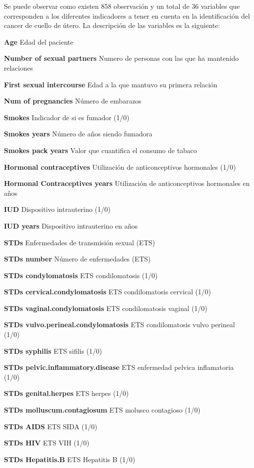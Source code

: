 \documentclass[
]{article}
\begin{document}
Se puede observar como existen 858 observación y un total de 36
variables que corresponden a los diferentes indicadores a tener en
cuenta en la identificación del cancer de cuello de útero. La
descripción de las variables es la siguiente:

\textbf{Age} Edad del paciente

\textbf{Number of sexual partners} Numero de personas con las que ha
mantenido relaciones

\textbf{First sexual intercourse} Edad a la que mantuvo su primera
relación

\textbf{Num of pregnancies} Número de embarazos

\textbf{Smokes} Indicador de si es fumador (1/0)

\textbf{Smokes years} Número de años siendo fumadora

\textbf{Smokes pack years} Valor que cuantifica el consumo de tabaco

\textbf{Hormonal contraceptives} Utilización de anticonceptivos
hormonales (1/0)

\textbf{Hormonal Contraceptives years} Utilización de anticonceptivos
hormonales en años

\textbf{IUD} Dispositivo intrauterino (1/0)

\textbf{IUD years} Dispositivo intrauterino en años

\textbf{STDs} Enfermedades de transmisión sexual (ETS)

\textbf{STDs number} Número de enfermedades (ETS)

\textbf{STDs condylomatosis} ETS condilomatosis (1/0)

\textbf{STDs cervical.condylomatosis} ETS condilomatosis cervical (1/0)

\textbf{STDs vaginal.condylomatosis} ETS condilomatosis vaginal (1/0)

\textbf{STDs vulvo.perineal.condylomatosis} ETS condilomatosis vulvo
perineal (1/0)

\textbf{STDs syphilis} ETS sifilis (1/0)

\textbf{STDs pelvic.inflammatory.disease} ETS enfermedad pelvica
inflamatoria (1/0)

\textbf{STDs genital.herpes} ETS herpes (1/0)

\textbf{STDs molluscum.contagiosum} ETS molusco contagioso (1/0)

\textbf{STDs AIDS} ETS SIDA (1/0)

\textbf{STDs HIV} ETS VIH (1/0)

\textbf{STDs Hepatitis.B} ETS Hepatitis B (1/0)
\end{document}
